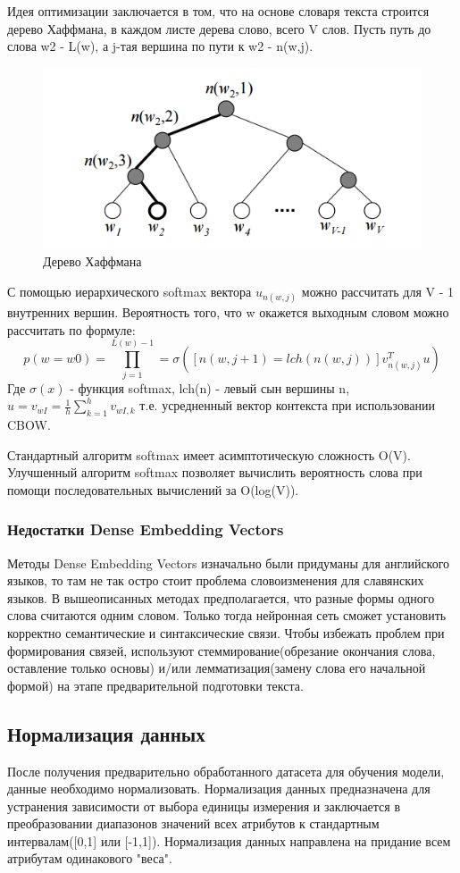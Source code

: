 Идея оптимизации заключается в том, что на основе словаря текста строится дерево Хаффмана, в каждом листе дерева слово, всего V слов. Пусть путь до слова w2 - L(w), а j-тая вершина по пути к w2 - n(w,j).
\begin{figure}[!h]
	\centering
	\includegraphics[width=.5\textwidth]{master_img/haffman.png}
	\caption{Дерево Хаффмана}
	\label{fig04_master}
\end{figure}
С помощью иерархического softmax вектора $u_{n(w,j)}$ можно рассчитать для V - 1 внутренних вершин.
Вероятность того, что w окажется выходным словом можно рассчитать по формуле:
\begin{equation}
p(w = w0) = \prod_{j=1}^{L(w) - 1} = \sigma([n(w,j + 1) = lch(n(w,j))]v^T_{n(w,j)}u)
\end{equation}
Где $\sigma(x)$ - функция softmax, lch(n) - левый сын вершины n, $u=v_{wI}=\frac{1}{h}\sum^h_{k=1}v_{wI,k}$ т.е. усредненный вектор контекста при использовании CBOW.

Стандартный алгоритм softmax имеет асимптотическую сложность O(V). Улучшенный алгоритм softmax позволяет вычислить вероятность слова при помощи последовательных вычислений за O(log(V)).

\subsubsection{Недостатки Dense Embedding Vectors}
Методы Dense Embedding Vectors изначально были придуманы для английского языков, то там не так остро стоит проблема словоизменения для славянских языков.  В вышеописанных методах предполагается, что разные формы одного слова считаются одним словом. Только тогда нейронная сеть сможет установить корректно семантические и синтаксические связи. Чтобы избежать проблем при формирования связей, используют стеммирование(обрезание окончания слова, оставление только основы) и/или лемматизация(замену слова его начальной формой) 
 на этапе предварительной подготовки текста.
 
\subsection{Нормализация данных} 
После получения предварительно обработанного датасета для обучения модели, данные необходимо нормализовать. Нормализация данных предназначена для устранения зависимости от выбора единицы измерения и заключается в преобразовании диапазонов значений всех атрибутов к стандартным интервалам([0,1] или [-1,1])\cite{Book25}. Нормализация данных направлена на придание всем атрибутам одинакового "веса".

